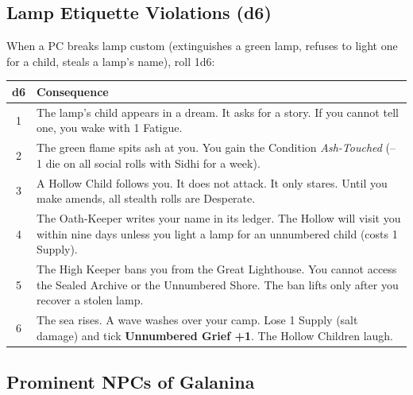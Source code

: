 \subsection*{Lamp Etiquette Violations (d6)}
When a PC breaks lamp custom (extinguishes a green lamp, refuses to light one for a child, steals a lamp's name), roll 1d6:
\begin{center}
\begin{tabular}{|c|l|}
\hline
\textbf{d6} & \textbf{Consequence} \\
\hline
1 & The lamp's child appears in a dream. It asks for a story. If you cannot tell one, you wake with 1 Fatigue. \\
2 & The green flame spits ash at you. You gain the Condition \textit{Ash-Touched} (--1 die on all social rolls with Sidhi for a week). \\
3 & A Hollow Child follows you. It does not attack. It only stares. Until you make amends, all stealth rolls are Desperate. \\
4 & The Oath-Keeper writes your name in its ledger. The Hollow will visit you within nine days unless you light a lamp for an unnumbered child (costs 1 Supply). \\
5 & The High Keeper bans you from the Great Lighthouse. You cannot access the Sealed Archive or the Unnumbered Shore. The ban lifts only after you recover a stolen lamp. \\
6 & The sea rises. A wave washes over your camp. Lose 1 Supply (salt damage) and tick \textbf{Unnumbered Grief +1}. The Hollow Children laugh. \\
\hline
\end{tabular}
\end{center}

\subsection*{Prominent NPCs of Galanina}
\label{sec:galanina-npcs}

